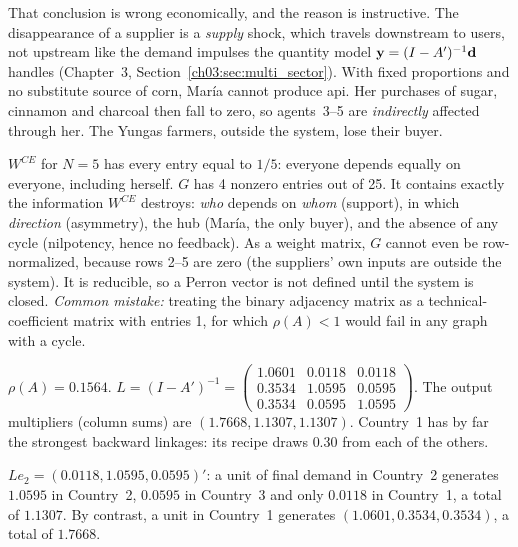 \documentclass[../solutions_manual.tex]{subfiles}
\begin{document}
That conclusion is wrong economically, and the reason is instructive. The disappearance of a supplier is a \emph{supply} shock, which travels downstream to users, not upstream like the demand impulses the quantity model $\mathbf{y} = (I - A')^{-1}\mathbf d$ handles (Chapter~3, Section~\ref{ch03:sec:multi_sector}). With fixed proportions and no substitute source of corn, Mar\'ia cannot produce api. Her purchases of sugar, cinnamon and charcoal then fall to zero, so agents~3--5 are \emph{indirectly} affected through her. The Yungas farmers, outside the system, lose their buyer.

 $W^{CE}$ for $N = 5$ has every entry equal to $1/5$: everyone depends equally on everyone, including herself. $G$ has 4 nonzero entries out of 25. It contains exactly the information $W^{CE}$ destroys: \emph{who} depends on \emph{whom} (support), in which \emph{direction} (asymmetry), the hub (Mar\'ia, the only buyer), and the absence of any cycle (nilpotency, hence no feedback). As a weight matrix, $G$ cannot even be row-normalized, because rows 2--5 are zero (the suppliers' own inputs are outside the system). It is reducible, so a Perron vector is not defined until the system is closed. \emph{Common mistake:} treating the binary adjacency matrix as a technical-coefficient matrix with entries 1, for which $\rho(A) < 1$ would fail in any graph with a cycle.


 $\rho(A) = 0.1564$. $L = (I - A')^{-1} = \begin{pmatrix} 1.0601 & 0.0118 & 0.0118\\ 0.3534 & 1.0595 & 0.0595\\ 0.3534 & 0.0595 & 1.0595\end{pmatrix}$. The output multipliers (column sums) are $(1.7668, 1.1307, 1.1307)$. Country~1 has by far the strongest backward linkages: its recipe draws $0.30$ from each of the others.

 $L e_2 = (0.0118, 1.0595, 0.0595)'$: a unit of final demand in Country~2 generates $1.0595$ in Country~2, $0.0595$ in Country~3 and only $0.0118$ in Country~1, a total of $1.1307$. By contrast, a unit in Country~1 generates $(1.0601, 0.3534, 0.3534)$, a total of $1.7668$.
\end{document}

